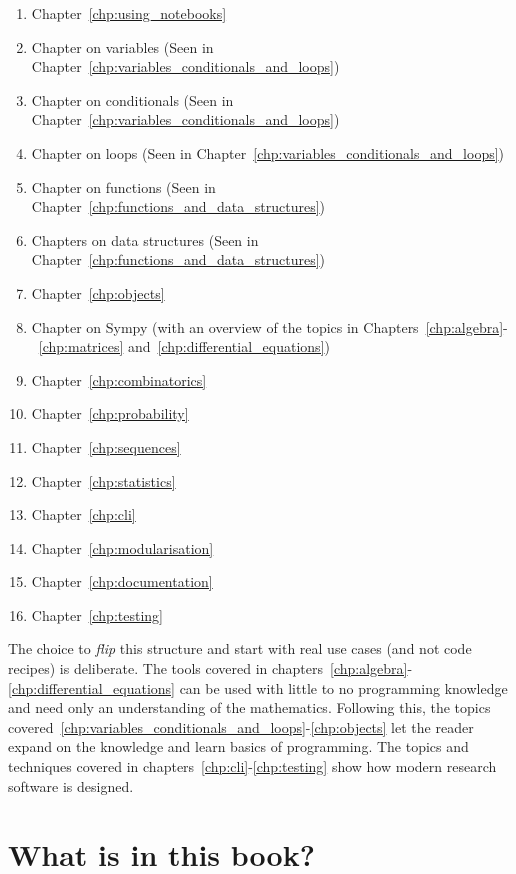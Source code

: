 \begin{enumerate}
    \item Chapter~\ref{chp:using_notebooks}
    \item Chapter on variables (Seen in Chapter~\ref{chp:variables_conditionals_and_loops})
    \item Chapter on conditionals (Seen in Chapter~\ref{chp:variables_conditionals_and_loops})
    \item Chapter on loops (Seen in Chapter~\ref{chp:variables_conditionals_and_loops})
    \item Chapter on functions (Seen in Chapter~\ref{chp:functions_and_data_structures})
    \item Chapters on data structures (Seen in Chapter~\ref{chp:functions_and_data_structures})
    \item Chapter~\ref{chp:objects}
    \item Chapter on Sympy (with an overview of the topics in Chapters~\ref{chp:algebra}-~\ref{chp:matrices} and~\ref{chp:differential_equations})
    \item Chapter~\ref{chp:combinatorics}
    \item Chapter~\ref{chp:probability}
    \item Chapter~\ref{chp:sequences}
    \item Chapter~\ref{chp:statistics}
    \item Chapter~\ref{chp:cli}
    \item Chapter~\ref{chp:modularisation}
    \item Chapter~\ref{chp:documentation}
    \item Chapter~\ref{chp:testing}
\end{enumerate}

The choice to \textit{flip} this structure and start with real use cases (and
not code recipes) is deliberate. The tools covered in
chapters~\ref{chp:algebra}-\ref{chp:differential_equations} can be used with
little to no programming knowledge and need only an understanding of the
mathematics. Following this, the topics
covered~\ref{chp:variables_conditionals_and_loops}-\ref{chp:objects} let the reader
expand on the knowledge and learn basics of programming. The topics and techniques covered in
chapters~\ref{chp:cli}-\ref{chp:testing} show how modern research
software is designed.

\section{What is in this book?}

